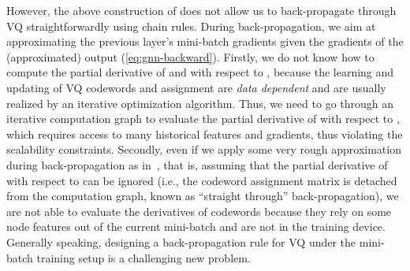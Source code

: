 \documentclass{article}
\renewcommand{\emph}[1]{\textit{#1}}
\begin{document}
However, the above construction of  does not allow us to back-propagate through VQ straightforwardly using chain rules. During back-propagation, we aim at approximating the previous layer's mini-batch gradients  given the gradients of the (approximated) output  (\cref{eq:gnn-backward}). Firstly, we do not know how to compute the partial derivative of  and  with respect to , because the learning and updating of VQ codewords and assignment are \emph{data dependent} and are usually realized by an iterative optimization algorithm. Thus, we need to go through an iterative computation graph to evaluate the partial derivative of  with respect to , which requires access to many historical features and gradients, thus violating the scalability constraints. Secondly, even if we apply some very rough approximation during back-propagation as in~\citep{oord2017neural}, that is, assuming that the partial derivative of  with respect to  can be ignored (i.e., the codeword assignment matrix is detached from the computation graph, known as ``straight through'' back-propagation), we are not able to evaluate the derivatives of codewords  because they rely on some node features out of the current mini-batch and are not in the training device.  Generally speaking, designing a back-propagation rule for VQ under the mini-batch training setup is a challenging new problem.

\begin{figure}[t]
\begin{floatrow}
\end{floatrow}
\vspace{-5pt}
\end{figure}
\end{document}
